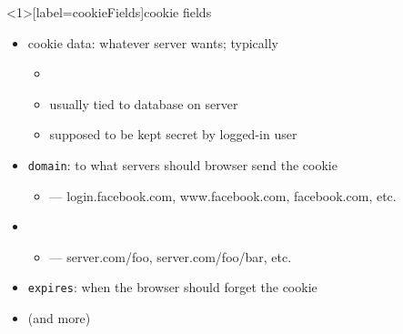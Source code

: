 

\begin{frame}<1>[label=cookieFields]{cookie fields}
    \begin{itemize}
        \item cookie data: whatever server wants; typically 
        \begin{itemize}
            \item {}
            \item usually tied to database on server
            \item supposed to be kept secret by logged-in user
        \end{itemize}
    \item \texttt{domain}: to what servers should browser send the cookie
        \begin{itemize}
            \item {} --- login.facebook.com, www.facebook.com, facebook.com, etc.
        \end{itemize}
    \item {}
        \begin{itemize}
            \item {} --- server.com/foo, server.com/foo/bar, etc.
        \end{itemize}
    \item \texttt{expires}: when the browser should forget the cookie
    \item (and more)
    \end{itemize}
\end{frame}
